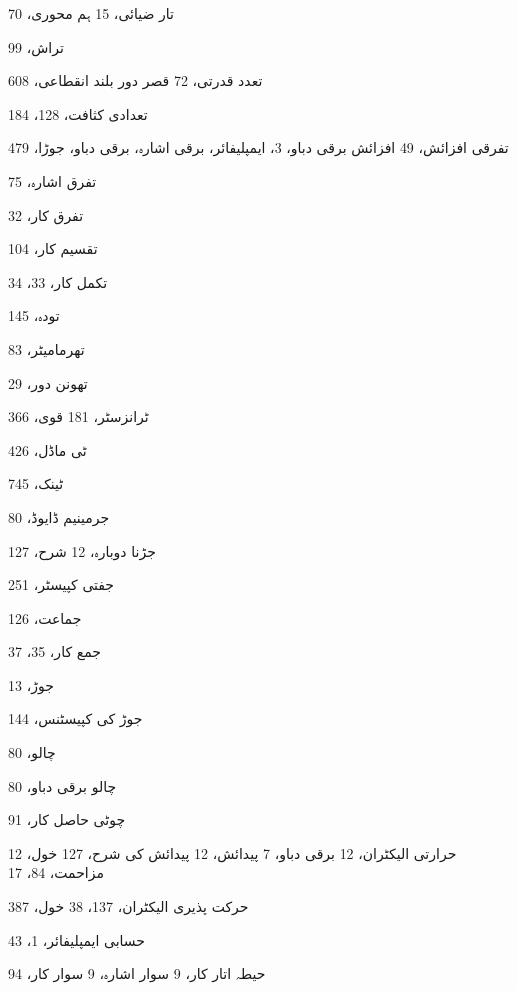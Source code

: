 \begin{theindex}
\indexspace

\item تار 
     \subitem ضیائی، 15 
     \subitem ہم محوری، 70
\item تراش، 99
\item تعدد 
     \subitem قدرتی، 72 
     \subitem قصر دور بلند انقطاعی، 608
\item تعدادی کثافت، 128، 184
\item تفرقی 
     \subitem افزائش، 49 
     \subitem افزائش برقی دباو، 3،  
     \subitem ایمپلیفائر،  
     \subitem برقی اشارہ،  
     \subitem برقی دباو،  
     \subitem جوڑا، 479
\item تفرق اشارہ، 75
\item تفرق کار، 32
\item تقسیم کار، 104
\item تکمل کار، 33، 34
\item تودہ، 145
\item تھرمامیٹر، 83
\item تھونن دور، 29

\indexspace

\item ٹرانزسٹر، 181 
     \subitem قوی، 366
\item ٹی ماڈل، 426
\item ٹینک، 745

\indexspace

\item جرمینیم ڈایوڈ، 80
\item جڑنا 
     \subitem دوبارہ، 12 
     \subitem شرح، 127
\item جفتی کپیسٹر، 251
\item جماعت، 126
\item جمع کار، 35، 37
\item جوڑ، 13
\item جوڑ کی کپیسٹنس، 144

\indexspace

\item چالو، 80
\item چالو برقی دباو، 80
\item چوٹی حاصل کار، 91

\indexspace

\item حرارتی 
     \subitem الیکٹران، 12 
     \subitem برقی دباو، 7 
     \subitem پیدائش، 12 
     \subitem پیدائش کی شرح، 127 
     \subitem خول، 12 
     \subitem مزاحمت، 84، 17
\item حرکت پذیری 
     \subitem الیکٹران، 137، 38 
     \subitem خول، 387
\item حسابی ایمپلیفائر، 1، 43
\item حیطہ 
     \subitem اتار کار، 9 
     \subitem سوار اشارہ، 9 
     \subitem سوار کار، 94


\end{theindex}
